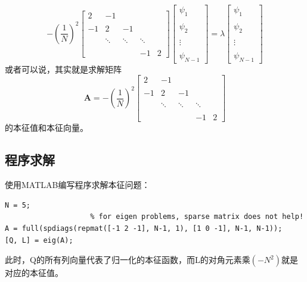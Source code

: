 \documentclass[paper=a4, fontsize=11pt]{scrartcl} %
\numberwithin{equation}{section} %
\numberwithin{figure}{section} %
\numberwithin{table}{section} %
\begin{document}
\begin{CJK*}{UTF8}{gbsn}
\begin{equation}
-(\frac{1}{N})^2 
\begin{bmatrix}
2 & -1 \\\\
-1 & 2 & -1 \\\\
 & \ddots & \ddots & \ddots \\\\
 & & &  -1& 2
 \end{bmatrix} 
 \begin{bmatrix}
 \psi_1 \\\\ \psi_2 \\\\ \vdots \\\\ \psi_{N-1} 
 \end{bmatrix} = \lambda 
 \begin{bmatrix}
 \psi_1 \\\\ \psi_2 \\\\ \vdots \\\\ \psi_{N-1} 
 \end{bmatrix}
\end{equation}
或者可以说，其实就是求解矩阵
\begin{equation}
\mathbf{A} = -(\frac{1}{N})^2 
\begin{bmatrix}
2 & -1 \\\\
-1 & 2 & -1 \\\\
 & \ddots & \ddots & \ddots \\\\
 & & &  -1& 2
 \end{bmatrix} 
\end{equation}
的本征值和本征向量。

\subsection{程序求解}
使用MATLAB编写程序求解本征问题：
\lstset{language=MATLAB}
\begin{lstlisting}
N = 5;
                    % for eigen problems, sparse matrix does not help!
A = full(spdiags(repmat([-1 2 -1], N-1, 1), [1 0 -1], N-1, N-1));
[Q, L] = eig(A);
\end{lstlisting}
此时，Q的所有列向量代表了归一化的本征函数，而L的对角元素乘$(-N^2)$就是对应的本征值。


\end{CJK*}
\end{document}
